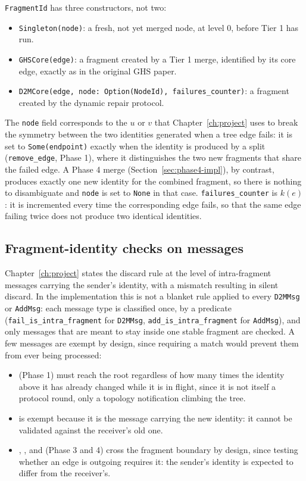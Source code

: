 \texttt{FragmentId} has three constructors, not two:

\begin{itemize}
  \item \texttt{Singleton(node)}: a fresh, not yet merged node, at level 0, before Tier 1
  has run.
  \item \texttt{GHSCore(edge)}: a fragment created by a Tier 1 merge, identified by its
  core edge, exactly as in the original GHS paper.
  \item \texttt{D2MCore(edge, node: Option(NodeId), failures\_counter)}: a fragment
  created by the dynamic repair protocol.
\end{itemize}

The \texttt{node} field corresponds to the $u$ or $v$ that Chapter~\ref{ch:project} uses
to break the symmetry between the two identities generated when a tree edge fails: it is
set to \texttt{Some(endpoint)} exactly when the identity is produced by a split
(\texttt{remove\_edge}, Phase 1), where it distinguishes the two new fragments that share
the failed edge. A Phase 4 merge (Section~\ref{sec:phase4-impl}), by contrast, produces
exactly one new identity for the combined fragment, so there is nothing to disambiguate
and \texttt{node} is set to \texttt{None} in that case. \texttt{failures\_counter} is
$k(e)$: it is incremented every time the corresponding edge fails, so that the same edge
failing twice does not produce two identical identities.

\subsection{Fragment-identity checks on messages}\label{sec:intra-fragment}

Chapter~\ref{ch:project} states the discard rule at the level of intra-fragment messages
carrying the sender's identity, with a mismatch resulting in silent discard. In the
implementation this is not a blanket rule applied to every \texttt{D2MMsg} or
\texttt{AddMsg}: each message type is classified once, by a predicate
(\texttt{fail\_is\_intra\_fragment} for \texttt{D2MMsg}, \texttt{add\_is\_intra\_fragment}
for \texttt{AddMsg}), and only messages that are meant to stay inside one stable fragment
are checked. A few messages are exempt by design, since requiring a match would prevent
them from ever being processed:

\begin{itemize}
  \item {} (Phase 1) must reach the root regardless of how many times the
  identity above it has already changed while it is in flight, since it is not itself a
  protocol round, only a topology notification climbing the tree.
  \item {} is exempt because it is the message carrying the new identity: it
  cannot be validated against the receiver's old one.
  \item {}, , and  (Phase 3 and 4) cross the
  fragment boundary by design, since testing whether an edge is outgoing requires it: the
  sender's identity is expected to differ from the receiver's.
\end{itemize}


